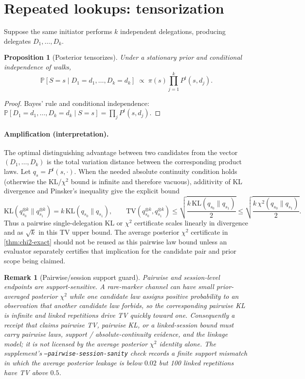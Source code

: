 \documentclass[11pt]{article}
\newtheorem{proposition}[theorem]{Proposition}
\newtheorem{remark}[theorem]{Remark}
\newcommand{\TV}{\mathrm{TV}}
\newcommand{\KL}{\mathrm{KL}}
\newcommand{\Prb}{\mathbb{P}}
\begin{document}
\section{Repeated lookups: tensorization}\label{sec:repeated}
Suppose the same initiator performs $k$ independent delegations, producing
delegates $D_1,\dots,D_k$.

\begin{proposition}[Posterior tensorizes]\label{prop:tensor}
Under a stationary prior and conditional independence of walks,
\[
\Prb[S=s\mid D_1=d_1,\dots,D_k=d_k]
\;\propto\; \pi(s)\prod_{j=1}^k P^t(s,d_j).
\]
\end{proposition}
\begin{proof}
Bayes' rule and conditional independence:
$\Prb[D_1=d_1,\dots,D_k=d_k\mid S=s]=\prod_j P^t(s,d_j)$.
\end{proof}

\paragraph{Amplification (interpretation).}
The optimal distinguishing advantage between two candidates from the vector
$(D_1,\dots,D_k)$ is the total variation distance between the corresponding
product laws.  Let $q_s=P^t(s,\cdot)$.  When the needed absolute continuity
condition holds (otherwise the KL/$\chi^2$ bound is infinite and therefore
vacuous), additivity of KL divergence and Pinsker's inequality give the explicit
bound
\[
\KL(q_{s_0}^{\otimes k}\|q_{s_1}^{\otimes k})
  = k\,\KL(q_{s_0}\|q_{s_1}),
\qquad
\TV(q_{s_0}^{\otimes k},q_{s_1}^{\otimes k})
  \le \sqrt{\frac{k\,\KL(q_{s_0}\|q_{s_1})}{2}}
  \le \sqrt{\frac{k\,\chi^2(q_{s_0}\|q_{s_1})}{2}} .
\]
Thus a pairwise single-delegation KL or $\chi^2$ certificate scales linearly in
divergence and as $\sqrt{k}$ in this TV upper bound.  The average posterior
$\chi^2$ certificate in \cref{thm:chi2-exact} should not be reused as this
pairwise law bound unless an evaluator separately certifies that implication for
the candidate pair and prior scope being claimed.

\begin{remark}[Pairwise/session support guard]
Pairwise and session-level endpoints are support-sensitive.  A rare-marker
channel can have small prior-averaged posterior $\chi^2$ while one candidate law
assigns positive probability to an observation that another candidate law forbids,
so the corresponding pairwise KL is infinite and linked repetitions drive TV
quickly toward one.  Consequently a receipt that claims pairwise TV, pairwise KL,
or a linked-session bound must carry pairwise laws, support / absolute-continuity
evidence, and the linkage model; it is not licensed by the average posterior
$\chi^2$ identity alone.  The supplement's
\texttt{--pairwise-session-sanity} check records a finite support mismatch in
which the average posterior leakage is below $0.02$ but 100 linked repetitions
have TV above $0.5$.
\end{remark}
\end{document}
